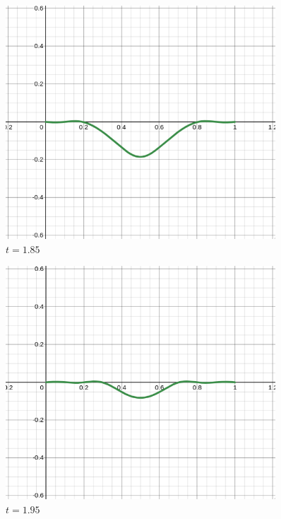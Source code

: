 \documentclass[letter, 10pts]{article}
\begin{document}
\begin{minipage}{0.5\textwidth}
\begin{figure}[H]
	\centering
	\includegraphics[width=0.9\textwidth]{../phys311/ss/dx3.png}
	\caption{$t = 1.85$}
	\label{fig:ss-c_n_01-png}
\end{figure}
\begin{figure}[H]
	\centering
	\includegraphics[width=0.9\textwidth]{../phys311/ss/dx4.png}
	\caption{$t = 1.95$}
	\label{fig:ss-c_n_01-png}
\end{figure}
\end{minipage}
\newpage
\end{document}
